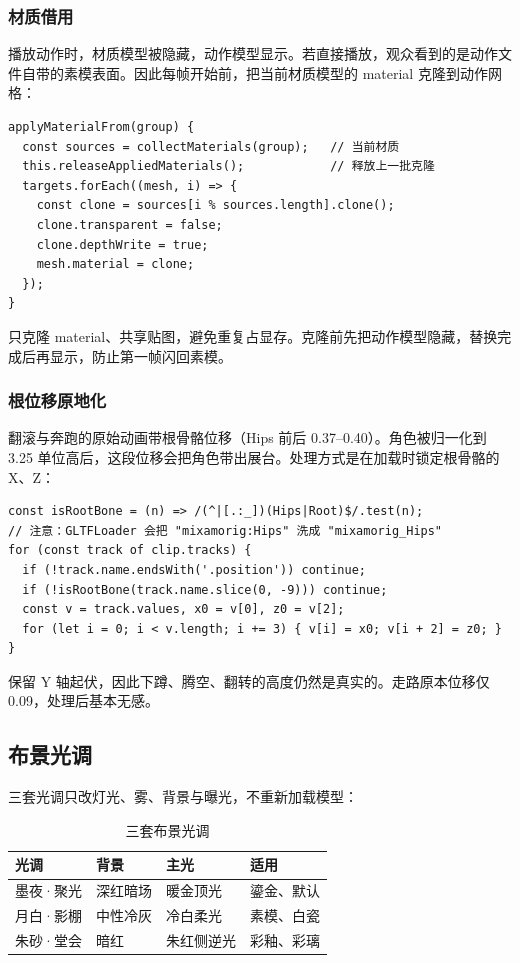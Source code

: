 \documentclass[UTF8,a4paper,11pt]{ctexart}
\begin{document}
\subsubsection{材质借用}
播放动作时，材质模型被隐藏，动作模型显示。若直接播放，观众看到的是动作文件自带的素模表面。因此每帧开始前，把当前材质模型的 material 克隆到动作网格：

\begin{lstlisting}
applyMaterialFrom(group) {
  const sources = collectMaterials(group);   // 当前材质
  this.releaseAppliedMaterials();            // 释放上一批克隆
  targets.forEach((mesh, i) => {
    const clone = sources[i % sources.length].clone();
    clone.transparent = false;
    clone.depthWrite = true;
    mesh.material = clone;
  });
}
\end{lstlisting}

只克隆 material、共享贴图，避免重复占显存。克隆前先把动作模型隐藏，替换完成后再显示，防止第一帧闪回素模。

\subsubsection{根位移原地化}
翻滚与奔跑的原始动画带根骨骼位移（Hips 前后 0.37--0.40）。角色被归一化到 3.25 单位高后，这段位移会把角色带出展台。处理方式是在加载时锁定根骨骼的 X、Z：

\begin{lstlisting}
const isRootBone = (n) => /(^|[.:_])(Hips|Root)$/.test(n);
// 注意：GLTFLoader 会把 "mixamorig:Hips" 洗成 "mixamorig_Hips"
for (const track of clip.tracks) {
  if (!track.name.endsWith('.position')) continue;
  if (!isRootBone(track.name.slice(0, -9))) continue;
  const v = track.values, x0 = v[0], z0 = v[2];
  for (let i = 0; i < v.length; i += 3) { v[i] = x0; v[i + 2] = z0; }
}
\end{lstlisting}

保留 Y 轴起伏，因此下蹲、腾空、翻转的高度仍然是真实的。走路原本位移仅 0.09，处理后基本无感。

\subsection{布景光调}
三套光调只改灯光、雾、背景与曝光，不重新加载模型：

\begin{table}[H]
\centering
\small
\caption{三套布景光调}
\begin{tabular}{@{}llll@{}}
\toprule
光调 & 背景 & 主光 & 适用 \\
\midrule
墨夜·聚光 & 深红暗场 & 暖金顶光 & 鎏金、默认 \\
月白·影棚 & 中性冷灰 & 冷白柔光 & 素模、白瓷 \\
朱砂·堂会 & 暗红 & 朱红侧逆光 & 彩釉、彩璃 \\
\bottomrule
\end{tabular}
\end{table}
\end{document}
